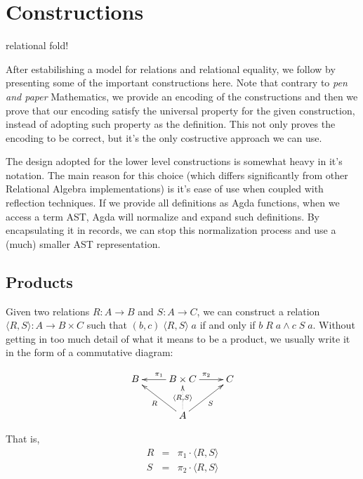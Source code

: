 \section{Constructions}

\begin{TODO}
  \item relational fold!
\end{TODO}

After estabilishing a model for relations and relational equality, we follow by presenting
some of the important constructions here. Note that contrary to \emph{pen and paper} Mathematics,
we provide an encoding of the constructions and then we prove that our encoding satisfy the
universal property for the given construction, instead of adopting such property as the
definition. This not only proves the encoding to be correct, but it's the only costructive approach
we can use.

The design adopted for the lower level constructions is somewhat heavy in it's notation. The
main reason for this choice (which differs significantly from other Relational Algebra implementations)
is it's ease of use when coupled with reflection techniques. If we provide all definitions
as Agda functions, when we access a term AST, Agda will normalize and expand such definitions.
By encapsulating it in records, we can stop this normalization process and use a (much) smaller
AST representation.

\subsection{Products}

Given two relations $R : A \rightarrow B$ and $S : A \rightarrow C$, we can construct a relation
$\langle R , S \rangle : A \rightarrow B \times C$ such that $(b,c)\;\langle R , S \rangle\;a$ if and only if $b\;R\;a \wedge c\;S\;a$.
Without getting in too much detail of what it means to be a product, we usually write
it in the form of a commutative diagram:

\begin{displaymath}
\xymatrix{%
B & B \times C \ar[l]_{\pi_1} \ar[r]^{\pi_2} & C \\
  &     A \ar@{..>}[u]|{\langle R , S \rangle} \ar[ul]^{R} \ar[ur]_{S}
  &
}
\end{displaymath} 

That is,
\begin{eqnarray*}
  R &=& \pi_1 \cdot \langle R , S \rangle \\
  S &=& \pi_2 \cdot \langle R , S \rangle
\end{eqnarray*}

